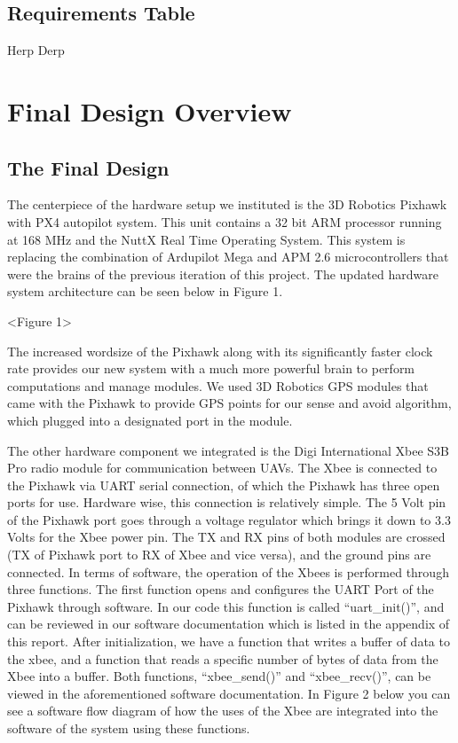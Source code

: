 \documentclass[12pt]{article}
\begin{document}
\subsection{Requirements Table}
Herp Derp

\section{Final Design Overview}
\subsection{The Final Design}
	The centerpiece of the hardware setup we instituted is the 3D Robotics Pixhawk with PX4 autopilot system. This unit contains a 32 bit ARM processor running at 168 MHz and the NuttX Real Time Operating System. This system is replacing the combination of Ardupilot Mega and APM 2.6 microcontrollers that were the brains of the previous iteration of this project. The updated hardware system architecture can be seen below in Figure 1. 

<Figure 1>

	The increased wordsize of the Pixhawk along with its significantly faster clock rate provides our new system with a much more powerful brain to perform computations and manage modules. We used 3D Robotics GPS modules that came with the Pixhawk to provide GPS points for our sense and avoid algorithm, which plugged into a designated port in the module. 

	The other hardware component we integrated is the Digi International Xbee S3B Pro radio module for communication between UAVs. The Xbee is connected to the Pixhawk via UART serial connection, of which the Pixhawk has three open ports for use. Hardware wise, this connection is relatively simple. The 5 Volt pin of the Pixhawk port goes through a voltage regulator which brings it down to 3.3 Volts for the Xbee power pin. The TX and RX pins of both modules are crossed (TX of Pixhawk port to RX of Xbee and vice versa), and the ground pins are connected. In terms of software, the operation of the Xbees is performed through three functions. The first function opens and configures the UART Port of the Pixhawk through software. In our code this function is called “uart\_init()”, and can be reviewed in our software documentation which is listed in the appendix of this report. After initialization, we have a function that writes a buffer of data to the xbee, and a function that reads a specific number of bytes of data from the Xbee into a buffer. Both functions, “xbee\_send()” and “xbee\_recv()”, can be viewed in the aforementioned software documentation. In Figure 2 below you can see a software flow diagram of how the uses of the Xbee are integrated into the software of the system using these functions.
\end{document}
